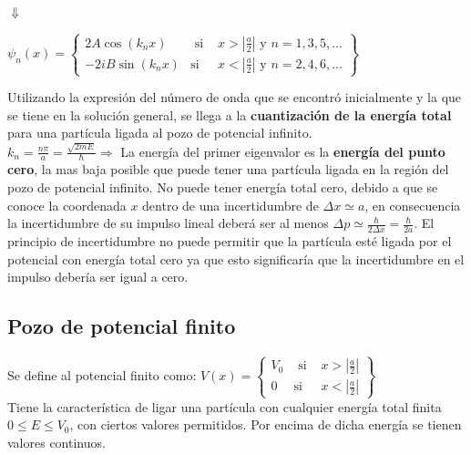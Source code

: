 \documentclass[oneside]{book}
\numberwithin{equation}{section}
\numberwithin{figure}{section}
\numberwithin{table}{section}
\begin{document}
				\begin{center}
					$\Downarrow$
				\end{center}
				
				\begin{center}
				$\displaystyle \psi_n(x)=\begin{Bmatrix} 2A\cos(k_nx)  & \mbox{ si }& x>|\frac{a}{2}| \mbox{ y } n=1,3,5,\ldots \\ -2iB\sin(k_nx) & \mbox{si}& x<|\frac{a}{2}| \mbox{ y } n=2,4,6,\ldots \end{Bmatrix}$
				\end{center}
				
				Utilizando la expresión del número de onda que se encontró inicialmente y la que se tiene en la solución general, se llega a la \textbf{cuantización de la energía total} para una partícula ligada al pozo de potencial infinito.\\
				
				$\displaystyle k_n=\frac{n\pi}{a}=\frac{\sqrt{2mE}}{\hbar} \Rightarrow$  La energía del primer eigenvalor es la \textbf{energía del punto cero}, la mas baja posible que puede tener una partícula ligada en la región del pozo de potencial infinito. No puede tener energía total cero, debido a que se conoce la coordenada $x$ dentro de una incertidumbre de $\Delta x \simeq a$, en consecuencia la incertidumbre de su impulso lineal deberá ser al menos $\displaystyle \Delta p\simeq \frac{\hbar}{2\Delta x}=\frac{\hbar}{2a}$. El principio de incertidumbre no puede permitir que la partícula esté ligada por el potencial con energía total cero ya que esto significaría que la incertidumbre en el impulso debería ser igual a cero.
				
				\subsection{Pozo de potencial finito}		
				
				Se define al potencial finito como: $\displaystyle V(x)=\begin{Bmatrix} V_0 & \mbox{ si }& x>|\frac{a}{2}| \\ 0 & \mbox{si}& x<|\frac{a}{2}|\end{Bmatrix}$\\
								
				Tiene la característica de ligar una partícula con cualquier energía total finita $0 \leq E \leq V_0$, con ciertos valores permitidos. Por encima de dicha energía se tienen valores continuos.\\
				
\end{document}
